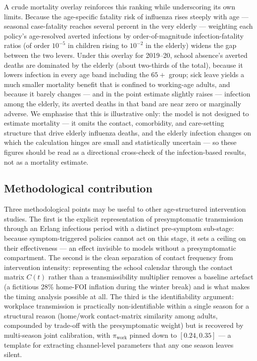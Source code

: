 \documentclass[12pt]{article}
\theoremstyle{plain}
\theoremstyle{remark}
\theoremstyle{definition}
\begin{document}
A crude mortality overlay reinforces this ranking while underscoring its own limits. Because the age-specific fatality risk of influenza rises steeply with age --- seasonal case-fatality reaches several percent in the very elderly \cite{McDonald2023} --- weighting each policy's age-resolved averted infections by order-of-magnitude infection-fatality ratios (of order $10^{-5}$ in children rising to $10^{-2}$ in the elderly) widens the gap between the two levers. Under this overlay for 2019--20, school absence's averted deaths are dominated by the elderly (about two-thirds of the total), because it lowers infection in every age band including the $65+$ group; sick leave yields a much smaller mortality benefit that is confined to working-age adults, and because it barely changes --- and in the point estimate slightly raises --- infection among the elderly, its averted deaths in that band are near zero or marginally adverse. We emphasise that this is illustrative only: the model is not designed to estimate mortality --- it omits the contact, comorbidity, and care-setting structure that drive elderly influenza deaths, and the elderly infection changes on which the calculation hinges are small and statistically uncertain --- so these figures should be read as a directional cross-check of the infection-based results, not as a mortality estimate.

\subsection{Methodological contribution}
Three methodological points may be useful to other age-structured intervention studies. The first is the explicit representation of presymptomatic transmission through an Erlang infectious period with a distinct pre-symptom sub-stage: because symptom-triggered policies cannot act on this stage, it sets a ceiling on their effectiveness --- an effect invisible to models without a presymptomatic compartment. The second is the clean separation of contact frequency from intervention intensity: representing the school calendar through the contact matrix $C(t)$ rather than a transmissibility multiplier removes a baseline artefact (a fictitious 28\% home-FOI inflation during the winter break) and is what makes the timing analysis possible at all. The third is the identifiability argument: workplace transmission is practically non-identifiable within a single season for a structural reason (home/work contact-matrix similarity among adults, compounded by trade-off with the presymptomatic weight) but is recovered by multi-season joint calibration, with $\pi_{\mathrm{work}}$ pinned down to $[0.24, 0.35]$ --- a template for extracting channel-level parameters that any one season leaves silent.
\end{document}
